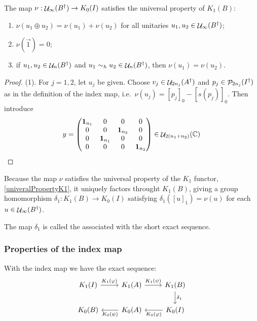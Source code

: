 \begin{lemma}
The map $\nu: \mathop{\mathcal{U}}\nolimits_\infty(B^\dagger)\to K_0(I)$ satisfies the universal property of $K_1(B)$:
\begin{enumerate}
\item $\nu(u_1\oplus u_2) = \nu(u_1)+\nu(u_2)$ for all unitaries $u_1,u_2\in\mathop{\mathcal{U}}\nolimits_\infty(B^\dagger)$;
\item $\nu(\vec{1}) = 0$;
\item if $u_1,u_2\in\mathop{\mathcal{U}}\nolimits_n(B^\dagger)$ and $u_1\sim_h u_2 \in \mathop{\mathcal{U}}\nolimits_n(B^\dagger)$, then $\nu(u_1) = \nu(u_2)$.
\end{enumerate}
\end{lemma}
\begin{proof}
(1). For $j=1,2$, let $u_j$ be given. Choose $v_j \in \mathop{\mathcal{U}}\nolimits_{2n_j}(A^\dagger)$ and $p_j \in \mathop{\mathcal{P}}\nolimits_{2n_j}(I^\dagger)$ as in the definition of the index map, i.e.\ $\nu(u_j) = [p_j]_0 - [s(p_j)]_0$. Then introduce
\[ y = \begin{pmatrix}
\boldsymbol{\mathrm{1}}_{n_1} & 0 & 0 & 0 \\
0 & 0 & \boldsymbol{\mathrm{1}}_{n_2} & 0 \\
0 & \boldsymbol{\mathrm{1}}_{n_1} & 0 & 0 \\
0 & 0 & 0 & \boldsymbol{\mathrm{1}}_{n_2}
\end{pmatrix}\in \mathop{\mathcal{U}}\nolimits_{2(n_1+n_2)}(\mathbb{C}) \]
\end{proof}

Because the map $\nu$ satisfies the universal property of the $K_1$ functor, \ref{univeralPropertyK1}, it uniquely factors throught $K_1(B)$, giving a group homomorphism $\delta_1: K_1(B)\to K_0(I)$ satisfying $\delta_1([u]_1) = \nu(u)$ for each $u\in\mathop{\mathcal{U}}\nolimits_\infty(B^\dagger)$.

The map $\delta_1$ is called the  associated with the short exact sequence.

\subsubsection{Properties of the index map}
With the index map we have the exact sequence:
\[ \begin{tikzcd}
K_1(I) \rar{K_1(\varphi)} & K_1(A) \rar{K_1(\psi)} & K_1(B) \dar{\delta_1} \\
K_0(B) & K_0(A) \lar{K_0(\psi)} & K_0(I) \lar{K_0(\varphi)}
\end{tikzcd} \]

